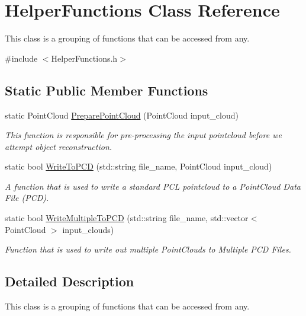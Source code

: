 \hypertarget{class_helper_functions}{\section{\-Helper\-Functions \-Class \-Reference}
\label{class_helper_functions}
}


\-This class is a grouping of functions that can be accessed from any.  




{\ttfamily \#include $<$\-Helper\-Functions.\-h$>$}

\subsection*{\-Static \-Public \-Member \-Functions}
\begin{DoxyCompactItemize}
\item 
static \-Point\-Cloud \hyperlink{class_helper_functions_a2e817646b20092d5f7179ba89635b50f}{\-Prepare\-Point\-Cloud} (\-Point\-Cloud input\-\_\-cloud)
\begin{DoxyCompactList}\small\item\em \-This function is responsible for pre-\/processing the input pointcloud before we attempt object reconstruction. \end{DoxyCompactList}\item 
static bool \hyperlink{class_helper_functions_a4b25abbfbd620e9218b2949c758a8872}{\-Write\-To\-P\-C\-D} (std\-::string file\-\_\-name, \-Point\-Cloud input\-\_\-cloud)
\begin{DoxyCompactList}\small\item\em \-A function that is used to write a standard \-P\-C\-L pointcloud to a \-Point\-Cloud \-Data \-File (\-P\-C\-D). \end{DoxyCompactList}\item 
static bool \hyperlink{class_helper_functions_a4428222439104c10e58e04958a231c37}{\-Write\-Multiple\-To\-P\-C\-D} (std\-::string file\-\_\-name, std\-::vector$<$ \-Point\-Cloud $>$ input\-\_\-clouds)
\begin{DoxyCompactList}\small\item\em \-Function that is used to write out multiple \-Point\-Clouds to \-Multiple \-P\-C\-D \-Files. \end{DoxyCompactList}\end{DoxyCompactItemize}


\subsection{\-Detailed \-Description}
\-This class is a grouping of functions that can be accessed from any. 

